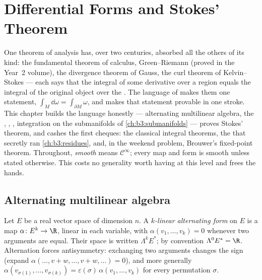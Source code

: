 \chapter{Differential Forms and Stokes' Theorem}\label{ch:b3:forms}

One theorem of analysis has, over two centuries, absorbed all
the others of its kind: the fundamental theorem of calculus,
Green--Riemann (proved in the Year~2 volume), the divergence
theorem of Gauss, the curl theorem of Kelvin--Stokes --- each
says that the integral of some derivative over a region equals
the integral of the original object over the . The
language of \emph{} makes them one statement,
$\int_M\dd\omega = \int_{\partial M}\omega$, and makes that
statement provable in one stroke. This chapter builds the
language honestly --- alternating multilinear algebra, the
, , , integration on the
submanifolds of \cref{ch:b3:submanifolds} --- proves Stokes'
theorem, and cashes the first cheques: the classical integral
theorems, the  that secretly ran
\cref{ch:b3:residues}, and, in the weekend problem, Brouwer's
fixed-point theorem. Throughout, \emph{smooth} means $\mathcal
C^\infty$; every map and form is smooth unless stated
otherwise. This costs no generality worth having at this level
and frees the hands.

\section{Alternating multilinear algebra}

\begin{definition}\label{def:b3:forms:alternating}
Let $E$ be a real vector space of dimension $n$. A
\emph{$k$-linear alternating form} on
$E$ is a map $\alpha\colon E^k \to \R$, linear in each
variable, with $\alpha(v_1, \dots, v_k) = 0$ whenever two
arguments are equal. Their space is written $\Lambda^k E^*$;
by convention $\Lambda^0E^* = \R$. Alternation forces
antisymmetry: exchanging two arguments changes the sign
(expand $\alpha(\dots, v + w, \dots, v + w, \dots) = 0$), and
more generally $\alpha(v_{\sigma(1)}, \dots, v_{\sigma(k)}) =
\varepsilon(\sigma)\,\alpha(v_1, \dots, v_k)$ for every
permutation $\sigma$.
\end{definition}

